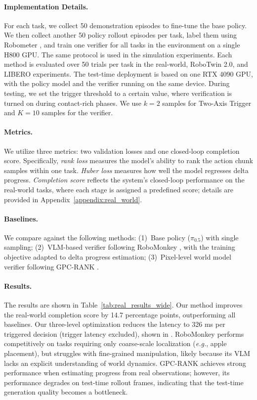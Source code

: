 \documentclass[10pt,twocolumn,letterpaper]{article}
\begin{document}
\paragraph{Implementation Details.} For each task, we collect 50 demonstration episodes to fine-tune the base policy. We then collect another 50 policy rollout episodes per task, label them using Robometer \cite{liang2026robometerscalinggeneralpurposerobotic}, and train one verifier for all tasks in the environment on a single H800 GPU. The same protocol is used in the simulation experiments. Each method is evaluated over 50 trials per task in the real-world, RoboTwin 2.0, and LIBERO experiments. The test-time deployment is based on one RTX 4090 GPU, with the policy model and the verifier running on the same device. During testing, we set the trigger threshold to a certain value, where verification is turned on during contact-rich phases. We use $k=2$ samples for Two-Axis Trigger and $K=10$ samples for the verifier.

\paragraph{Metrics.} We utilize three metrics: two validation losses and one closed-loop completion score. Specifically, \textit{rank loss} measures the model's ability to rank the action chunk samples within one task. \textit{Huber loss} measures how well the model regresses delta progress. \textit{Completion score} reflects the system's closed-loop performance on the real-world tasks, where each stage is assigned a predefined score; details are provided in Appendix~\ref{appendix:real_world}.

\paragraph{Baselines.} We compare against the following methods: (1)~Base policy ($\pi_{0.5}$) with single sampling;
(2)~VLM-based verifier following RoboMonkey \cite{kwok2025robomonkeyscalingtesttimesampling}, with the training objective adapted to delta progress estimation;
(3)~Pixel-level world model verifier following GPC-RANK \cite{qi2026inferencetimeenhancementgenerativerobot}.

\paragraph{Results.} The results are shown in Table~\ref{tab:real_results_wide}. Our method improves the real-world completion score by 14.7 percentage points, outperforming all baselines. Our three-level optimization reduces the latency to 326 ms per triggered decision (trigger latency excluded), shown in . RoboMonkey performs competitively on tasks requiring only coarse-scale localization (\textit{e.g.}, apple placement), but struggles with fine-grained manipulation, likely because its VLM lacks an explicit understanding of world dynamics. GPC-RANK achieves strong performance when estimating progress from real observations; however, its performance degrades on test-time rollout frames, indicating that the test-time generation quality becomes a bottleneck.
\end{document}
